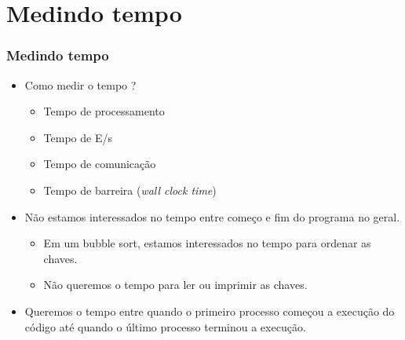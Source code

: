 \documentclass[xcolor={usenames,dvipsnames},12pt,presentation,aspectratio=169]{beamer}
\begin{document}
\section{Medindo tempo}
\begin{frame}[fragile]
  \frametitle{Medindo tempo}
  \begin{itemize}
  \item Como medir o tempo ?
  \begin{itemize}
    \item Tempo de processamento
    \item Tempo de E/s
    \item Tempo de comunicação
    \item Tempo de barreira  (\emph{wall clock time})
  \end{itemize}  
  \item Não estamos interessados no tempo entre começo e fim do programa no geral.
  \begin{itemize}
    \item Em um bubble sort, estamos interessados no tempo para ordenar as chaves.
    \item Não queremos o tempo para ler ou imprimir as chaves.
  \end{itemize}  
  \item Queremos o tempo entre quando o primeiro processo começou a execução do código até quando o último processo terminou a execução.
\end{itemize}
\end{frame}
\end{document}
